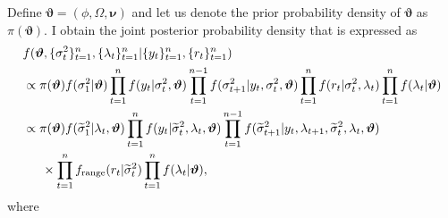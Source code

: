\documentclass[11pt]{article}
\begin{document}
Define $\bm{\vartheta}=(\phi, \Omega, \bm{\nu})$ and let us denote the prior probability density of $\bm{\vartheta}$ as $\pi(\bm{\vartheta})$. 
I obtain the joint posterior probability density that is expressed as 
\begin{align}
&f(\bm{\vartheta}, \{\sigma^2_t\}_{t=1}^n, \{\lambda_t\}_{t=1}^n | \{y_t\}_{t=1}^n, \{r_t\}_{t=1}^n) \notag \\
&\propto \pi(\bm{\vartheta}) f(\sigma^2_1 |\bm{\vartheta}) \prod_{t=1}^{n} f(y_t |\sigma^2_{t}, \bm{\vartheta}) 
 \prod_{t=1}^{n-1} f(\sigma^2_{t+1} |y_t, \sigma^2_{t}, \bm{\vartheta}) \prod_{t=1}^{n} f(r_t |\sigma^2_t, \lambda_t) \prod_{t=1}^{n} f(\lambda_t |\bm{\vartheta}) \\
&\propto \pi(\bm{\vartheta}) f(\widetilde{\sigma}^2_1 |\lambda_t, \bm{\vartheta}) \prod_{t=1}^{n} f(y_t |\widetilde{\sigma}^2_{t}, \lambda_t, \bm{\vartheta}) 
 \prod_{t=1}^{n-1} f(\widetilde{\sigma}^2_{t+1} |y_t, \lambda_{t+1}, \widetilde{\sigma}^2_{t}, \lambda_t, \bm{\vartheta}) \notag \\
&\hspace{15pt} \times\prod_{t=1}^{n} f_{\mathrm{range}}(r_t |\widetilde{\sigma}^2_t) \prod_{t=1}^{n} f(\lambda_t |\bm{\vartheta}), 
\end{align}
where
\end{document}
